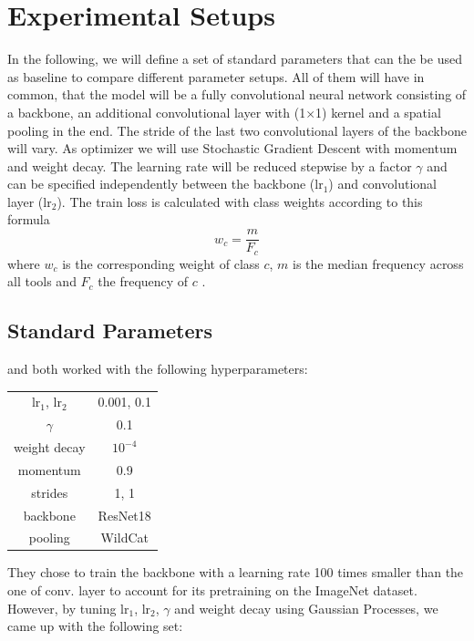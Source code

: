 \section{Experimental Setups}

In the following, we will define a set of standard parameters that can the be used as baseline to compare different parameter setups. All of them will have in common, that the model will be a fully convolutional neural network consisting of a backbone, an additional convolutional layer with (1$\times$1) kernel and a spatial pooling in the end. The stride of the last two convolutional layers of the backbone will vary. As optimizer we will use Stochastic Gradient Descent with momentum and weight decay. The learning rate will be reduced stepwise by a factor $\gamma$ and can be specified independently between the backbone (lr$_1$) and convolutional layer (lr$_2$). The train loss is calculated with class weights according to this formula
\[w_c = \frac{m}{F_c}\]
where $w_c$ is the corresponding weight of class $c$, $m$ is the median frequency across all tools and $F_c$ the frequency of $c$ \citep{lstm}.

\subsection{Standard Parameters}

\cite{Vardazaryan} and \cite{lstm} both worked with the following hyperparameters:

\begin{center}
	\begin{tabular}{ c | c }
		lr$_1$, lr$_2$ & 0.001, 0.1\\  
		$\gamma$ & 0.1\\
		weight decay & $10^{-4}$\\
		\color{gray}momentum & \color{gray}0.9\\
		\color{gray}strides & \color{gray}1, 1\\
		\color{gray}backbone & \color{gray}ResNet18\\
		\color{gray}pooling & \color{gray}WildCat
	\end{tabular}
\end{center}

They chose to train the backbone with a learning rate 100 times smaller than the one of conv. layer to account for its pretraining on the ImageNet dataset.\\

However, by tuning lr$_1$, lr$_2$, $\gamma$ and weight decay using Gaussian Processes, we came up with the following set:

